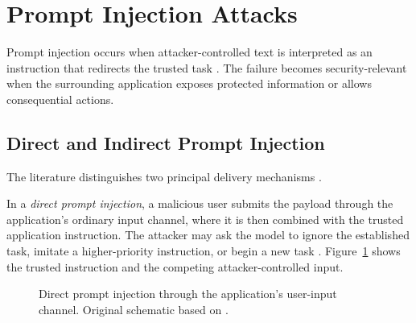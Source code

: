 \section{Prompt Injection Attacks}
\label{sec:prompt-injection}

Prompt injection occurs when attacker-controlled text is interpreted as an
instruction that redirects the trusted task
\parencite{perez2022ignore}. The failure becomes security-relevant when the
surrounding application exposes protected information or allows consequential
actions.

\subsection{Direct and Indirect Prompt Injection}
\label{subsec:direct-indirect}

The literature distinguishes two principal delivery mechanisms
\parencite{greshake2023indirect}.

In a \emph{direct prompt injection}, a malicious user submits the payload
through the application's ordinary input channel, where it is then combined 
with the trusted application instruction. The attacker may ask the
model to ignore the established task, imitate a higher-priority instruction,
or begin a new task
\parencite{perez2022ignore}. Figure~\ref{fig:direct-prompt-injection} shows the
trusted instruction and the competing attacker-controlled input.

\begin{figure}[H]
    \centering
    \caption[Direct prompt injection]{Direct prompt injection through the
    application's user-input channel. Original schematic based on \textcite{perez2022ignore}.}
    \label{fig:direct-prompt-injection}
\end{figure}

